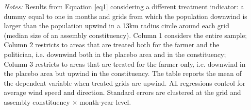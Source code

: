 \documentclass[12pt]{article}
\begin{document}
\begin{table}[h!]
   \caption{ Effect of exposing the population in a farmer placebo area to smoke on number of fires \label{tab:prosociality}} 
   \centering
   \singlespacing
   \resizebox{0.75\textwidth}{!}{
   
   }   
   \begin{minipage}{\textwidth}
    {\small \textit{Notes: }Results from Equation \ref{eq1} considering a different treatment indicator: a dummy equal to one in months and grids from which the population downwind is larger than the population upwind in a 13km radius circle around each grid (median size of an assembly constituency). %
    Column 1 considers the entire sample; Column 2 restricts to areas that are treated both for the farmer and the politician, i.e. downwind both in the placebo area and in the constituency; Column 3 restricts to areas that are treated for the farmer only, i.e. downwind in the placebo area but upwind in the constituency. 
    The table reports the mean of the dependent variable when treated grids are upwind. All regressions control for average wind speed and direction. Standard errors are clustered at the grid and assembly constituency $\times$ month-year level.  }
     \end{minipage}
\end{table}

\end{document}
